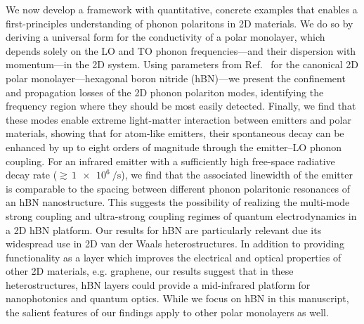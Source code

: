 \documentclass[aps,prb,twocolumn,
	           groupedaddress,superscriptaddress,
               amsfonts,amssymb,amsmath,floatfix,
	           citeautoscript]{revtex4-1}
\makeatletter
\newcommand{\eg}{e.g.\@\xspace}
\makeatother
\begin{document}
We now develop a framework with quantitative, concrete examples that enables a first-principles understanding of phonon polaritons in 2D materials. 
We do so by deriving a universal form for the conductivity of a polar monolayer,  which depends solely on the LO and TO phonon frequencies---and their dispersion with momentum---in the 2D system. Using parameters from Ref.~ for the canonical 2D polar monolayer---hexagonal boron nitride (hBN)---we present the confinement and propagation losses of the 2D phonon polariton modes, identifying the frequency region where they should be most easily detected. Finally, we find that these modes enable extreme light-matter interaction between emitters and polar materials, showing that for atom-like emitters, their spontaneous decay can be enhanced by up to eight orders of magnitude through the emitter--LO phonon coupling. For an infrared emitter with a sufficiently high free-space radiative decay rate (${\gtrsim}\, \SI{1e6}{\per\s}$), we find that the associated linewidth of the emitter is comparable to the spacing between different phonon polaritonic resonances of an hBN nanostructure. This suggests the possibility of realizing the multi-mode strong coupling and ultra-strong coupling regimes of quantum electrodynamics in a 2D hBN platform. Our results for hBN are particularly relevant due its widespread use in 2D van der Waals heterostructures. In addition to providing functionality as a layer which improves the electrical and optical properties of other 2D materials, \eg graphene, our results suggest that in these heterostructures, hBN layers could provide a mid-infrared platform for nanophotonics and quantum optics. While we focus on hBN in this manuscript, the salient features of our findings apply to other polar monolayers as well.
\end{document}
